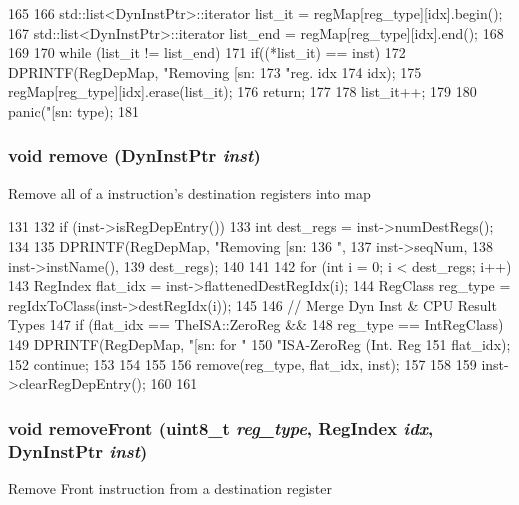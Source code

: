 \begin{DoxyCode}
165 {
166     std::list<DynInstPtr>::iterator list_it = regMap[reg_type][idx].begin();
167     std::list<DynInstPtr>::iterator list_end = regMap[reg_type][idx].end();
168 
169 
170     while (list_it != list_end) {
171         if((*list_it) == inst) {
172             DPRINTF(RegDepMap, "Removing [sn:%
173                     "reg. idx %
174                     idx);
175             regMap[reg_type][idx].erase(list_it);
176             return;
177         }
178         list_it++;
179     }
180     panic("[sn:%
      type);
181 }
\end{DoxyCode}
\hypertarget{classRegDepMap_a21558187a079b60fba92c9c66725f051}{
\subsubsection[{remove}]{\setlength{\rightskip}{0pt plus 5cm}void remove ({\bf DynInstPtr} {\em inst})}}
\label{classRegDepMap_a21558187a079b60fba92c9c66725f051}
Remove all of a instruction's destination registers into map 


\begin{DoxyCode}
131 {
132     if (inst->isRegDepEntry()) {
133         int dest_regs = inst->numDestRegs();
134 
135         DPRINTF(RegDepMap, "Removing [sn:%
136                 ", %
137                 inst->seqNum,
138                 inst->instName(),
139                 dest_regs);
140 
141 
142         for (int i = 0; i < dest_regs; i++) {
143             RegIndex flat_idx = inst->flattenedDestRegIdx(i);
144             RegClass reg_type = regIdxToClass(inst->destRegIdx(i));
145 
146             // Merge Dyn Inst & CPU Result Types
147             if (flat_idx == TheISA::ZeroReg &&
148                 reg_type == IntRegClass) {
149                 DPRINTF(RegDepMap, "[sn:%
      for "
150                         "ISA-ZeroReg (Int. Reg %
151                         flat_idx);
152                 continue;
153             }
154 
155 
156             remove(reg_type, flat_idx, inst);
157         }
158 
159         inst->clearRegDepEntry();
160     }
161 }
\end{DoxyCode}
\hypertarget{classRegDepMap_a40cf3c335b8ecc0c33de75fe822f25f7}{
\subsubsection[{removeFront}]{\setlength{\rightskip}{0pt plus 5cm}void removeFront (uint8\_\-t {\em reg\_\-type}, \/  {\bf RegIndex} {\em idx}, \/  {\bf DynInstPtr} {\em inst})}}
\label{classRegDepMap_a40cf3c335b8ecc0c33de75fe822f25f7}
Remove Front instruction from a destination register 


